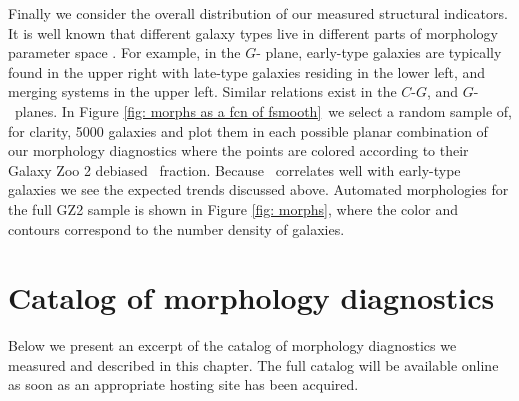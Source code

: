 
Finally we consider the overall distribution of our measured structural indicators. It is well known that different galaxy types live in different parts of morphology parameter space \citep{Abraham1996,Abraham2003,Conselice2000,Lotz2004,Lotz2008}. For example, in the $G$- plane, early-type galaxies are typically found in the upper right with late-type galaxies residing in the lower left, and merging systems in the upper left. Similar relations exist in the $C$-$G$, and $G$-~planes. In Figure \ref{fig: morphs as a fcn of fsmooth}~we select a random sample of, for clarity, 5000 galaxies and plot them in each possible planar combination of our morphology diagnostics where the points are colored according to their Galaxy Zoo 2 debiased \fsmooth~fraction. Because \fsmooth~correlates well with early-type galaxies we see the expected trends discussed above. Automated morphologies for the full GZ2 sample is shown in Figure \ref{fig: morphs}, where the color and contours correspond to the number density of galaxies. 



\section{Catalog of morphology diagnostics}
Below we present an excerpt of the catalog of morphology diagnostics we measured and described in this chapter. The full catalog will be available online as soon as an appropriate hosting site has been acquired. 


\label{tab: morphologies}


